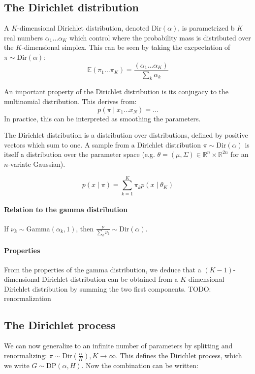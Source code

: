 \documentclass[twoside]{article}
\newcommand{\Dir}{\mathrm{Dir}}
\newcommand{\Gam}{\mathrm{Gamma}}
\newcommand{\DP}{\mathrm{DP}}
\newcommand{\todo}[1]{{\color{red} TODO: #1}}
\begin{document}
\subsection{The Dirichlet distribution}
A $K$-dimensional Dirichlet distribution, denoted $\Dir(\alpha)$, is parametrized b $K$ real numbers $\alpha_1 \dots \alpha_K$ which control where the probability mass is distributed over the $K$-dimensional simplex.
This can be seen by taking the excpectation of $\pi \sim \Dir(\alpha)$:
$$ \mathbb{E}(\pi_1 \dots \pi_K) = \frac{(\alpha_1 \dots \alpha_K)}{\sum_k \alpha_k} $$ 

An important property of the Dirichlet distribution is its conjugacy to the multinomial distribution. This derives from:
$$ p(\pi \mid x_1 \dots x_N) = \dots $$
In practice, this can be interpreted as smoothing the parameters.

The Dirichlet distribution is a distribution over distributions, defined by positive vectors which sum to one. A sample from a Dirichlet distribution $\pi \sim \Dir(\alpha)$ is itself a distribution over the parameter space (e.g. $\theta = (\mu, \Sigma) \in \mathbb{R}^n \times \mathbb{R}^{2n}$ for an $n$-variate Gaussian).

$$ p(x \mid \pi) = \sum_{k=1}^K \pi_k p(x \mid \theta_K) $$

\paragraph{Relation to the gamma distribution}

If $\nu_k \sim \Gam(\alpha_k, 1)$, then $\frac{\nu}{\sum_k \nu_k} \sim \Dir(\alpha)$.

\paragraph{Properties}

From the properties of the gamma distribution, we deduce that a $(K-1)$-dimensional Dirichlet distribution can be obtained from a $K$-dimensional Dirichlet distribution by summing the two first components.
\todo{renormalization}

\subsection{The Dirichlet process}
We can now generalize to an infinite number of parameters by splitting and renormalizing: $\pi \sim \Dir(\frac{\alpha}{K}), K \longrightarrow \infty$. This defines the Dirichlet process, which we write $G \sim \DP(\alpha, H)$. Now the combination can be written:
\end{document}
